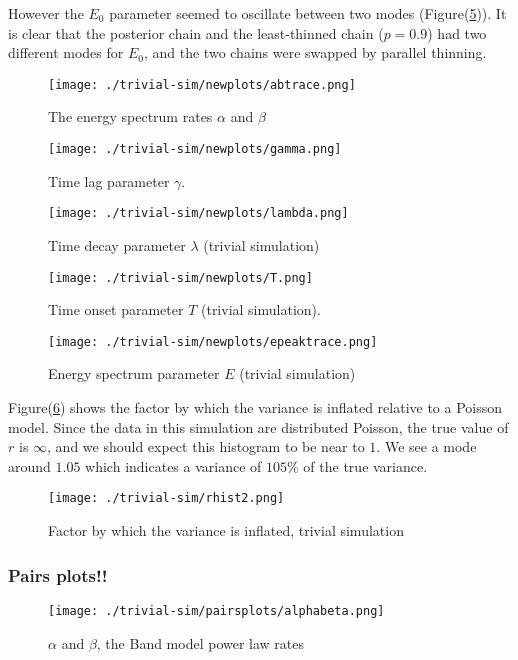 \documentclass[iop,onecolumn]{emulateapj}
\newcommand{\Fig}[1]{Figure\thinspace(\ref{#1})}
\begin{document}
However the $E_0$ parameter seemed to oscillate between two modes (\Fig{f:triv-E}). It is clear that the posterior chain and the least-thinned chain ($p=0.9$) had two different modes for $E_0$, and the two chains were swapped by parallel thinning.
\begin{figure}
 \centering
\texttt{[image: ./trivial-sim/newplots/abtrace.png]}
\caption{The energy spectrum rates $\alpha$ and $\beta$}
\label{f:triv-ab}
\end{figure}


\begin{figure}
 \centering
\texttt{[image: ./trivial-sim/newplots/gamma.png]}
\caption{Time lag parameter $\gamma$.}
\label{f:triv-gamma}
\end{figure}


\begin{figure}
 \centering
\texttt{[image: ./trivial-sim/newplots/lambda.png]}
\caption{Time decay parameter $\lambda$ (trivial simulation)}
\label{f:triv-lambda}
\end{figure}


\begin{figure}
 \centering
\texttt{[image: ./trivial-sim/newplots/T.png]}
\caption{Time onset parameter $T$ (trivial simulation).}
 \label{f:triv-T}
\end{figure}

\begin{figure}
 \centering
\texttt{[image: ./trivial-sim/newplots/epeaktrace.png]}
\caption{Energy spectrum parameter $E$ (trivial simulation)}
 \label{f:triv-E}
\end{figure}

\Fig{f:triv-r} shows the factor by which the variance is inflated relative to a Poisson model.  Since the data in this simulation are distributed Poisson, the true value of $r$ is $\infty$, and we should expect this histogram to be near to $1$. We see a mode around $1.05$ which indicates a variance of $105\%$ of the true variance.

\begin{figure}
 \centering
\texttt{[image: ./trivial-sim/rhist2.png]}
\caption{Factor by which the variance is inflated, trivial simulation}
 \label{f:triv-r}
\end{figure}

\subsubsection{Pairs plots!!}
\begin{figure}
 \centering
\texttt{[image: ./trivial-sim/pairsplots/alphabeta.png]}
\caption{$\alpha$ and $\beta$, the Band model power law rates}
\end{figure}
\end{document}
